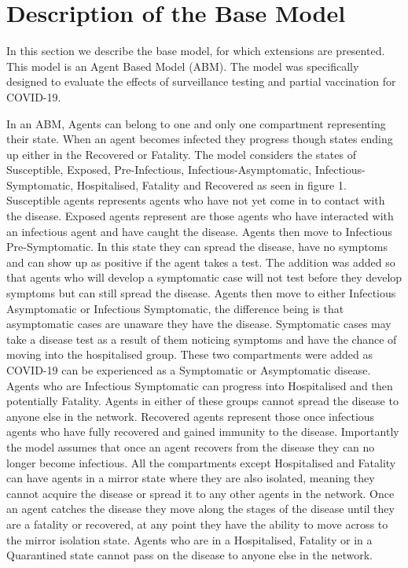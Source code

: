 \documentclass{article}
\begin{document}
\newpage
\section{Description of the Base Model \label{description}}

In this section we describe the base model, for which extensions are presented. 
This model is an Agent Based Model (ABM). 
The model was specifically designed to evaluate the effects of surveillance testing and partial vaccination for COVID-19.\newline

In an ABM, Agents can belong to one and only one compartment representing their state. 
When an agent becomes infected they progress though states ending up either in the Recovered or Fatality. 
The model considers the states of Susceptible, Exposed, Pre-Infectious, Infectious-Asymptomatic, Infectious-Symptomatic, Hospitalised, Fatality and Recovered as seen in figure 1.
Susceptible agents represents agents who have not yet come in to contact with the disease. 
Exposed agents represent are those agents who have interacted with an infectious agent and have caught the disease.
Agents then move to Infectious Pre-Symptomatic. In this state they can spread the disease, have no symptoms and can show up as positive if the agent takes a test. The addition was added so that agents who will develop a symptomatic case will not test before they develop symptoms but can still spread the disease.
Agents then move to either Infectious Asymptomatic or Infectious Symptomatic, the difference being is that asymptomatic cases are unaware they have the disease. Symptomatic cases may take a disease test as a result of them noticing symptoms and have the chance of moving into the hospitalised group. These two compartments were added as COVID-19 can be experienced as a Symptomatic or Asymptomatic disease. Agents who are Infectious Symptomatic can progress into Hospitalised and then potentially Fatality. Agents in either of these groups cannot spread the disease to anyone else in the network.
Recovered agents represent those once infectious agents who have fully recovered and gained immunity to the disease. 
Importantly the model assumes that once an agent recovers from the disease they can no longer become infectious. \newline 
All the compartments except Hospitalised and Fatality can have agents in a mirror state where they are also isolated, meaning they cannot acquire the disease or spread it to any other agents in the network. Once an agent catches the disease they move along the stages of the disease until they are a fatality or recovered, at any point they have the ability to move across to the mirror isolation state. Agents who are in a Hospitalised, Fatality or in a Quarantined state cannot pass on the disease to anyone else in the network.
\end{document}

